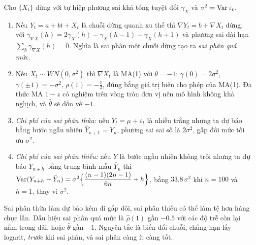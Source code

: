 \begin{kq}
Cho $\{X_t\}$ dừng với tự hiệp phương sai khả tổng tuyệt đối $\gamma_X$ và $\sigma^2=\operatorname{Var}\varepsilon_t$.
\begin{enumerate}[label=(\roman*),leftmargin=*,itemsep=1pt]
\item Nếu $Y_t=a+bt+X_t$ là chuỗi dừng quanh xu thế thì $\nabla Y_t=b+\nabla X_t$ dừng, với $\gamma_{\nabla X}(h)=2\gamma_X(h)-\gamma_X(h-1)-\gamma_X(h+1)$ và phương sai dài hạn $\sum_h\gamma_{\nabla X}(h)=0$. Nghĩa là sai phân một chuỗi dừng tạo ra \emph{sai phân quá mức}.
\item Nếu $X_t\sim WN(0,\sigma^2)$ thì $\nabla X_t$ là MA(1) với $\theta=-1$: $\gamma(0)=2\sigma^2$, $\gamma(\pm1)=-\sigma^2$, $\rho(1)=-\tfrac12$, đúng bằng giá trị biên cho phép của MA(1). Đa thức MA $1-z$ có nghiệm trên vòng tròn đơn vị nên mô hình không khả nghịch, và $\hat\theta$ sẽ dồn về $-1$.
\item \emph{Chi phí của sai phân thừa:} nếu $Y_t=\mu+\varepsilon_t$ là nhiễu trắng nhưng ta dự báo bằng bước ngẫu nhiên $\hat Y_{n+1}=Y_n$, phương sai sai số là $2\sigma^2$, gấp đôi mức tối ưu $\sigma^2$.
\item \emph{Chi phí của sai phân thiếu:} nếu $Y$ là bước ngẫu nhiên không trôi nhưng ta dự báo $Y_{n+h}$ bằng trung bình mẫu $\bar Y_n$ thì $\operatorname{Var}(Y_{n+h}-\bar Y_n)=\sigma^2\Bigl\{\dfrac{(n-1)(2n-1)}{6n}+h\Bigr\}$, bằng $33.8\,\sigma^2$ khi $n=100$ và $h=1$, thay vì $\sigma^2$.
\end{enumerate}
\end{kq}
Sai phân thừa làm dự báo kém đi gấp đôi, sai phân thiếu có thể làm tệ hơn hàng chục lần. Dấu hiệu sai phân quá mức là $\hat\rho(1)$ gần $-0.5$ với các độ trễ còn lại nằm trong dải, hoặc $\hat\theta$ gần $-1$. Nguyên tắc là biến đổi chuỗi, chẳng hạn lấy logarit, \emph{trước} khi sai phân, và sai phân càng ít càng tốt.

